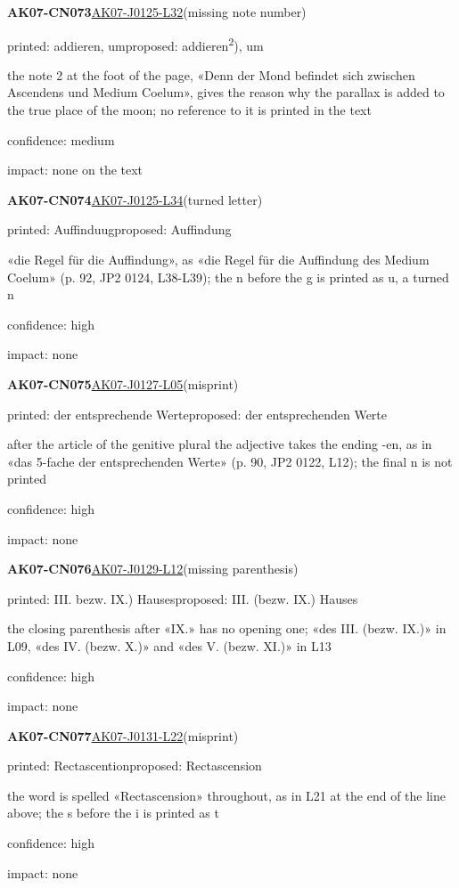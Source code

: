 \documentclass[11pt]{article}
\begin{document}
\noindent\textbf{AK07-CN073}\enspace\hyperlink{AK07-J0125-L32}{AK07-J0125-L32}\enspace(missing note number)\par\noindent printed: addieren, um\enspace proposed: addieren\textsuperscript{2}), um\par\noindent the note 2 at the foot of the page, «Denn der Mond befindet sich zwischen Ascendens und Medium Coelum», gives the reason why the parallax is added to the true place of the moon; no reference to it is printed in the text\par\noindent confidence: medium\par\noindent impact: none on the text\par\medskip
\noindent\textbf{AK07-CN074}\enspace\hyperlink{AK07-J0125-L34}{AK07-J0125-L34}\enspace(turned letter)\par\noindent printed: Auffinduug\enspace proposed: Auffindung\par\noindent «die Regel für die Auffindung», as «die Regel für die Auffindung des Medium Coelum» (p. 92, JP2 0124, L38-L39); the n before the g is printed as u, a turned n\par\noindent confidence: high\par\noindent impact: none\par\medskip
\noindent\textbf{AK07-CN075}\enspace\hyperlink{AK07-J0127-L05}{AK07-J0127-L05}\enspace(misprint)\par\noindent printed: der entsprechende Werte\enspace proposed: der entsprechenden Werte\par\noindent after the article of the genitive plural the adjective takes the ending -en, as in «das 5-fache der entsprechenden Werte» (p. 90, JP2 0122, L12); the final n is not printed\par\noindent confidence: high\par\noindent impact: none\par\medskip
\noindent\textbf{AK07-CN076}\enspace\hyperlink{AK07-J0129-L12}{AK07-J0129-L12}\enspace(missing parenthesis)\par\noindent printed: III. bezw. IX.) Hauses\enspace proposed: III. (bezw. IX.) Hauses\par\noindent the closing parenthesis after «IX.» has no opening one; «des III. (bezw. IX.)» in L09, «des IV. (bezw. X.)» and «des V. (bezw. XI.)» in L13\par\noindent confidence: high\par\noindent impact: none\par\medskip
\noindent\textbf{AK07-CN077}\enspace\hyperlink{AK07-J0131-L22}{AK07-J0131-L22}\enspace(misprint)\par\noindent printed: Rectascention\enspace proposed: Rectascension\par\noindent the word is spelled «Rectascension» throughout, as in L21 at the end of the line above; the s before the i is printed as t\par\noindent confidence: high\par\noindent impact: none\par\medskip
\end{document}
